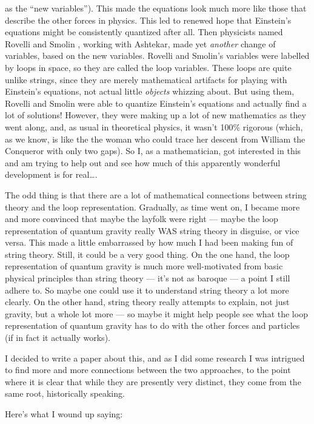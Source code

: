 \documentclass{article}
\begin{document}
as the ``new variables''). This made the equations look much more like
those that describe the other forces in physics. This led to renewed
hope that Einstein's equations might be consistently quantized after
all. Then physicists named Rovelli and Smolin , working with Ashtekar,
made yet \emph{another} change of variables, based on the new variables.
Rovelli and Smolin's variables were labelled by loops in space, so they
are called the loop variables. These loops are quite unlike strings,
since they are merely mathematical artifacts for playing with Einstein's
equations, not actual little \emph{objects} whizzing about. But using
them, Rovelli and Smolin were able to quantize Einstein's equations and
actually find a lot of solutions! However, they were making up a lot of
new mathematics as they went along, and, as usual in theoretical
physics, it wasn't 100\% rigorous (which, as we know, is like the the
woman who could trace her descent from William the Conqueror with only
two gaps). So I, as a mathematician, got interested in this and am
trying to help out and see how much of this apparently wonderful
development is for real\ldots.

The odd thing is that there are a lot of mathematical connections
between string theory and the loop representation. Gradually, as time
went on, I became more and more convinced that maybe the layfolk were
right --- maybe the loop representation of quantum gravity really WAS
string theory in disguise, or vice versa. This made a little embarrassed
by how much I had been making fun of string theory. Still, it could be a
very good thing. On the one hand, the loop representation of quantum
gravity is much more well-motivated from basic physical principles than
string theory --- it's not as baroque --- a point I still adhere to. So
maybe one could use it to understand string theory a lot more clearly.
On the other hand, string theory really attempts to explain, not just
gravity, but a whole lot more --- so maybe it might help people see what
the loop representation of quantum gravity has to do with the other
forces and particles (if in fact it actually works).

I decided to write a paper about this, and as I did some research I was
intrigued to find more and more connections between the two approaches,
to the point where it is clear that while they are presently very
distinct, they come from the same root, historically speaking.

Here's what I wound up saying:
\end{document}
